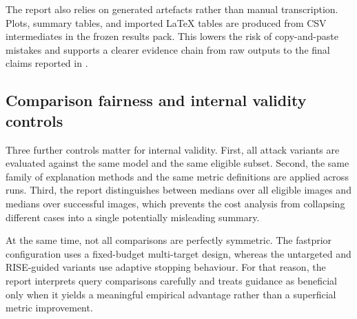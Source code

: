 The report also relies on generated artefacts rather than manual transcription.
Plots, summary tables, and imported \LaTeX{} tables are produced from CSV intermediates in the frozen results pack.
This lowers the risk of copy-and-paste mistakes and supports a clearer evidence chain from raw outputs to the final claims reported in .

\subsection{Comparison fairness and internal validity controls}
Three further controls matter for internal validity.
First, all attack variants are evaluated against the same model and the same eligible subset.
Second, the same family of explanation methods and the same metric definitions are applied across runs.
Third, the report distinguishes between medians over all eligible images and medians over successful images, which prevents the cost analysis from collapsing different cases into a single potentially misleading summary.

At the same time, not all comparisons are perfectly symmetric.
The fastprior configuration uses a fixed-budget multi-target design, whereas the untargeted and RISE-guided variants use adaptive stopping behaviour.
For that reason, the report interprets query comparisons carefully and treats guidance as beneficial only when it yields a meaningful empirical advantage rather than a superficial metric improvement.
